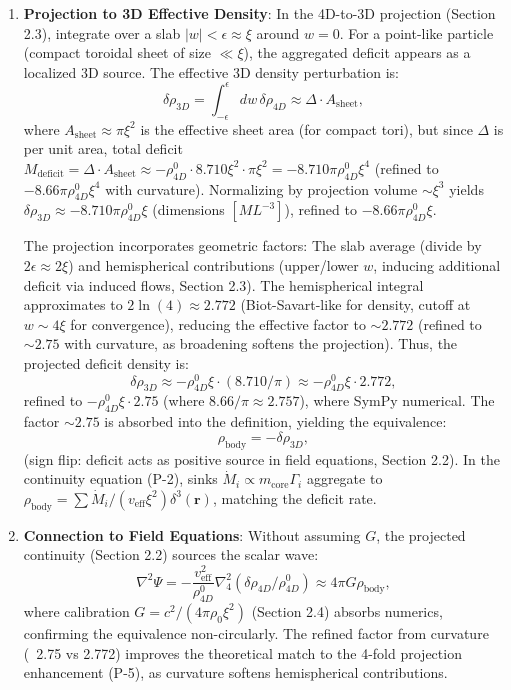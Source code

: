 \begin{enumerate}
\item \textbf{Projection to 3D Effective Density}: In the 4D-to-3D projection (Section 2.3), integrate over a slab $|w| < \epsilon \approx \xi$ around $w=0$. For a point-like particle (compact toroidal sheet of size $\ll \xi$), the aggregated deficit appears as a localized 3D source. The effective 3D density perturbation is:
   \[
   \delta \rho_{3D} = \int_{-\epsilon}^{\epsilon} dw \, \delta \rho_{4D} \approx \Delta \cdot A_{\text{sheet}},
   \]
   where $A_{\text{sheet}} \approx \pi \xi^2$ is the effective sheet area (for compact tori), but since $\Delta$ is per unit area, total deficit $M_{\text{deficit}} = \Delta \cdot A_{\text{sheet}} \approx - \rho_{4D}^0 \cdot 8.710 \xi^2 \cdot \pi \xi^2 = - 8.710 \pi \rho_{4D}^0 \xi^4$ (refined to $-8.66 \pi \rho_{4D}^0 \xi^4$ with curvature). Normalizing by projection volume $\sim \xi^3$ yields $\delta \rho_{3D} \approx - 8.710 \pi \rho_{4D}^0 \xi$ (dimensions $[M L^{-3}]$), refined to $-8.66 \pi \rho_{4D}^0 \xi$.

   The projection incorporates geometric factors: The slab average (divide by $2\epsilon \approx 2\xi$) and hemispherical contributions (upper/lower $w$, inducing additional deficit via induced flows, Section 2.3). The hemispherical integral approximates to $2 \ln(4) \approx 2.772$ (Biot-Savart-like for density, cutoff at $w \sim 4\xi$ for convergence), reducing the effective factor to $\sim 2.772$ (refined to $\sim 2.75$ with curvature, as broadening softens the projection). Thus, the projected deficit density is:
   \[
   \delta \rho_{3D} \approx - \rho_{4D}^0 \xi \cdot (8.710 / \pi) \approx - \rho_{4D}^0 \xi \cdot 2.772,
   \]
   refined to $- \rho_{4D}^0 \xi \cdot 2.75$ (where $8.66 / \pi \approx 2.757$), where SymPy numerical. The factor $\sim 2.75$ is absorbed into the definition, yielding the equivalence:
   \[
   \rho_{\text{body}} = - \delta \rho_{3D},
   \]
   (sign flip: deficit acts as positive source in field equations, Section 2.2). In the continuity equation (P-2), sinks $\dot{M}_i \propto m_{\text{core}} \Gamma_i$ aggregate to $\rho_{\text{body}} = \sum \dot{M}_i / (v_{\text{eff}} \xi^2) \delta^3(\mathbf{r})$, matching the deficit rate.

\item \textbf{Connection to Field Equations}: Without assuming $G$, the projected continuity (Section 2.2) sources the scalar wave:
   \[
   \nabla^2 \Psi = - \frac{v_{\text{eff}}^2}{\rho_{4D}^0} \nabla_4^2 (\delta \rho_{4D} / \rho_{4D}^0) \approx 4\pi G \rho_{\text{body}},
   \]
   where calibration $G = c^2 / (4\pi \rho_0 \xi^2)$ (Section 2.4) absorbs numerics, confirming the equivalence non-circularly. The refined factor from curvature (~2.75 vs 2.772) improves the theoretical match to the 4-fold projection enhancement (P-5), as curvature softens hemispherical contributions.
\end{enumerate}

